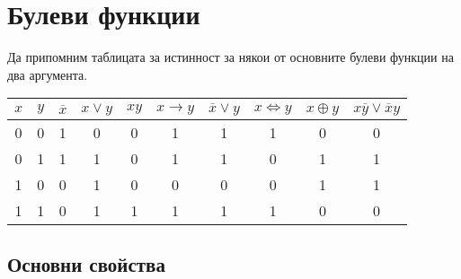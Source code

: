 \chapter{Булеви функции}


Да припомним таблицата за истинност за някои от основните булеви функции на два аргумента.

\begin{tabular}{|c|c|c|c|c|c|c|c|c|c|}
  \hline
  $x$ & $y$ & $\overline{x}$ & $x \vee y$ & $xy$ & $x \rightarrow y$ & $\overline{x}\vee y$ & $x \iff y$ & $x \oplus y$ & $x\overline{y} \vee \overline{x}y$\\
  \hline
  0 & 0 & 1 & 0 & 0 & 1 & 1 & 1 & 0 & 0 \\
  \hline
  0 & 1 & 1 & 1 & 0 & 1 & 1 & 0 & 1 & 1 \\
  \hline
  1 & 0 & 0 & 1 & 0 & 0 & 0 & 0 & 1 & 1 \\
  \hline
  1 & 1 & 0 & 1 & 1 & 1 & 1 & 1 & 0 & 0 \\
  \hline
\end{tabular}

\section{Основни свойства}

